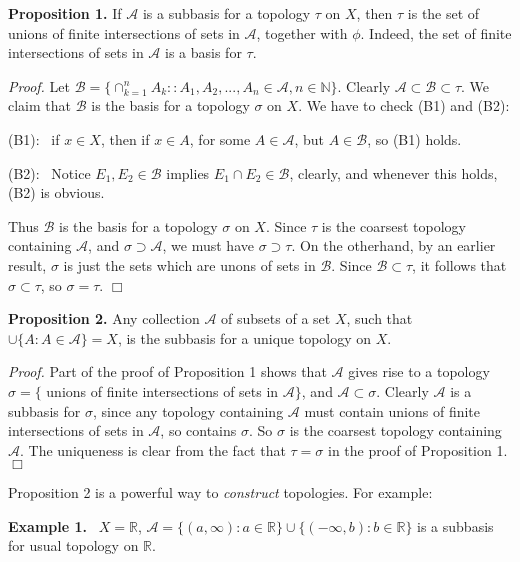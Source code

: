 \documentclass[12pt]{article}
\newcommand{\nats}[0] { \mathbb{N}}
\newcommand{\reals}[0] { \mathbb{R}}
\newcommand{\A}[0] { \mathcal{A} }
\newcommand{\B}[0] { \mathcal{B} }
\begin{document}
\begin{flushleft} {\bf Proposition 1. } If $\A$ is a subbasis for a topology $\tau$ on $X$, then $\tau$ is the set of unions of finite intersections of sets in $\A$, together with $\phi$. Indeed, the set of finite intersections of sets in $\A$ is a basis for $\tau$.
\end{flushleft}

\begin{flushleft} \emph{Proof.  } Let $\B = \{ \cap_{k=1}^n A_k :
: A_1, A_2, ..., A_n \in \A, n \in \nats \}$. Clearly $\A \subset \B \subset \tau$. We claim that $\B$ is the basis for a topology $\sigma$ on $X$. We have to check (B1)
and (B2):

(B1):  \ if $x \in X$, then if $x \in A$, for some $A \in \A$, but $A \in \B$, so  (B1)
holds.

(B2):  \ Notice $E_1, E_2 \in \B$ implies $E_1 \cap E_2 \in \B$, clearly,
 and whenever this holds, (B2) is obvious.

Thus $\B$ is the basis for a topology $\sigma$ on $X$.
Since $\tau$ is the coarsest topology containing $\A$, and $\sigma \supset \A$, we must have $\sigma \supset \tau$. On the otherhand, by an earlier result, $\sigma$ is just the sets which are
 unons of sets in $\B$.  Since $\B \subset \tau$,
it follows that $\sigma \subset \tau$, so $\sigma = \tau$. $\Box$
\end{flushleft}

\begin{flushleft} {\bf Proposition 2.} Any collection $\A$ of subsets of a set $X$, such that $\cup \{ A : A \in \A \} = X$, is the subbasis for a unique topology on $X$.
\end{flushleft}

\begin{flushleft} \emph{Proof.  } Part of the proof of
Proposition 1 shows that $\A$ gives rise to a topology
$\sigma = \{$ unions of finite intersections of sets in $\A \}$, and $\A \subset \sigma$. Clearly $\A$ is a subbasis for $\sigma$, since any topology containing $\A$ must
contain  unions of finite intersections of sets in $\A$, so contains $\sigma$.
So $\sigma$ is the coarsest topology containing $\A$. The uniqueness is
 clear from the fact that $\tau = \sigma$ in the proof of Proposition 1. $\Box$
\end{flushleft}

Proposition 2 is a powerful way to {\em construct} topologies.  For example:

\begin{flushleft} {\bf Example 1.} \  $X = \reals$, $\A = \{ (a,\infty)
:  a \in \reals \} \cup \{ (-\infty, b) :  b \in \reals \}$ is a subbasis for usual topology on $\reals$.
\end{flushleft}
\end{document}
